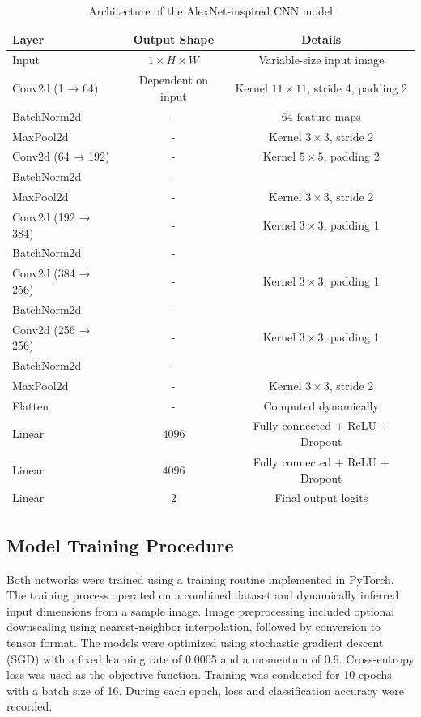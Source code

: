 \documentclass{pracalicmgr}
\begin{document}
\begin{table}[h]
\centering
\caption{Architecture of the AlexNet-inspired CNN model}
\label{tab:alexnet_architecture}
\begin{tabular}{|l|c|c|}
\hline
\textbf{Layer} & \textbf{Output Shape} & \textbf{Details} \\
\hline
Input & \(1 \times H \times W\) & Variable-size input image \\
\hline
Conv2d (1 → 64) & Dependent on input & Kernel \(11 \times 11\), stride 4, padding 2 \\
BatchNorm2d & - & 64 feature maps \\
MaxPool2d & - & Kernel \(3 \times 3\), stride 2 \\
\hline
Conv2d (64 → 192) & - & Kernel \(5 \times 5\), padding 2 \\
BatchNorm2d & - & \\
MaxPool2d & - & Kernel \(3 \times 3\), stride 2 \\
\hline
Conv2d (192 → 384) & - & Kernel \(3 \times 3\), padding 1 \\
BatchNorm2d & - & \\
\hline
Conv2d (384 → 256) & - & Kernel \(3 \times 3\), padding 1 \\
BatchNorm2d & - & \\
\hline
Conv2d (256 → 256) & - & Kernel \(3 \times 3\), padding 1 \\
BatchNorm2d & - & \\
MaxPool2d & - & Kernel \(3 \times 3\), stride 2 \\
\hline
Flatten & - & Computed dynamically \\
Linear & \(4096\) & Fully connected + ReLU + Dropout \\
Linear & \(4096\) & Fully connected + ReLU + Dropout \\
Linear & \(2\) & Final output logits \\
\hline
\end{tabular}
\end{table}


\subsection{Model Training Procedure}

Both networks were trained using a training routine implemented in PyTorch. The training process operated on a combined dataset and dynamically inferred input dimensions from a sample image. Image preprocessing included optional downscaling using nearest-neighbor interpolation, followed by conversion to tensor format. The models were optimized using stochastic gradient descent (SGD) with a fixed learning rate of 0.0005 and a momentum of 0.9. Cross-entropy loss was used as the objective function. Training was conducted for 10 epochs with a batch size of 16. During each epoch, loss and classification accuracy were recorded.
\end{document}
